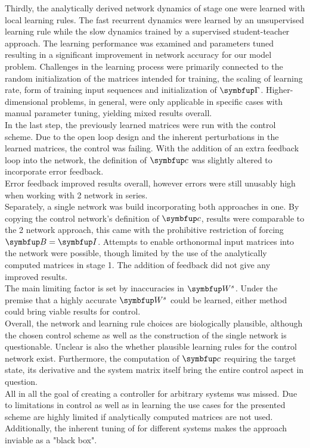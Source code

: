 Thirdly, the analytically derived network dynamics of stage one were learned with local learning rules. The fast recurrent dynamics were learned by an unsupervised learning rule while the slow dynamics trained by a supervised student-teacher approach. The learning performance was examined and parameters tuned resulting in a significant improvement in network accuracy for our model problem. Challenges in the learning process were primarily connected to the random initialization of the matrices intended for training, the scaling of learning rate, form of training input sequences and initialization of $\bmu{\Gamma}$. Higher-dimensional problems, in general, were only applicable in specific cases with manual parameter tuning, yielding mixed results overall.\\
In the last step, the previously learned matrices were run with the control scheme. Due to the open loop design and the inherent perturbations in the learned matrices, the control was failing. With the addition of an extra feedback loop into the network, the definition of $\bmu{c}$ was slightly altered to incorporate error feedback.\\
Error feedback improved results overall, however errors were still unusably high when working with 2 network in series.\\
Separately, a single network was build incorporating both approaches in one. By copying the control network's definition of $\bmu{c}$, results were comparable to the 2 network approach, this came with the prohibitive restriction of forcing $\bmu{B} = \bmu{I}$. Attempts to enable orthonormal input matrices into the network were possible, though limited by the use of the analytically computed matrices in stage 1. The addition of feedback did not give any improved results.\\
The main limiting factor is set by inaccuracies in $\bmu{W}^s$. Under the premise that a highly accurate $\bmu{W}^s$ could be learned, either method could bring viable results for control.\\
Overall, the network and learning rule choices are biologically plausible, although the chosen control scheme as well as the construction of the single network is questionable. Unclear is also the whether plausible learning rules for the control network exist. Furthermore, the computation of $\bmu{c}$ requiring the target state, its derivative and the system matrix itself bring the entire control aspect in question.\\
All in all the goal of creating a controller for arbitrary systems was missed. Due to limitations in control as well as in learning the use cases for the presented scheme are highly limited if analytically computed matrices are not used. Additionally, the inherent tuning of for different systems makes the approach inviable as a "black box".



